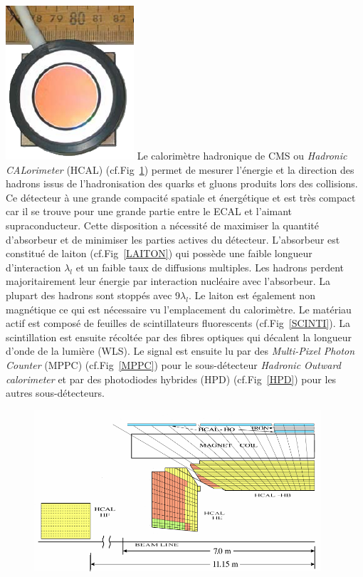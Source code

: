 \marginpar
{
	\centering
	\includegraphics[width=\marginparwidth]{CMS/HPD.png}
	\label{HPD}
}
Le calorimètre hadronique de CMS ou \textit{Hadronic CALorimeter} (HCAL) (cf.Fig~\ref{HCAL}) permet de mesurer l'énergie et la direction des hadrons issus de l'hadronisation des quarks et gluons produits lors des collisions. Ce détecteur à une grande compacité spatiale et énergétique et est très compact car il se trouve pour une grande partie entre le ECAL et l'aimant supraconducteur. Cette disposition a nécessité de maximiser la quantité d'absorbeur et de minimiser les parties actives du détecteur. L'absorbeur est constitué de laiton (cf.Fig~\ref{LAITON}) qui possède une faible longueur d'interaction $\lambda_{l}$ et un faible taux de diffusions multiples. Les hadrons perdent majoritairement leur énergie par interaction nucléaire avec l'absorbeur. La plupart des hadrons sont stoppés avec \num{9}$\lambda_{l}$. Le laiton est également non magnétique ce qui est nécessaire vu l'emplacement du calorimètre. Le matériau actif est composé de feuilles de scintillateurs fluorescents (cf.Fig~\ref{SCINTI}). La scintillation est ensuite récoltée par des fibres optiques qui décalent la longueur d'onde de la lumière (WLS). Le signal est ensuite lu par des \textit{Multi-Pixel Photon Counter} (MPPC) (cf.Fig~\ref{MPPC}) pour le sous-détecteur \textit{Hadronic Outward calorimeter} et par des photodiodes hybrides (HPD) (cf.Fig~\ref{HPD}) pour les autres sous-détecteurs.
\begin{figure}[ht!]
	\centering
	\includegraphics[width=0.95\textwidth]{CMS/HCALSCHEME.png}
	\label{HCAL}
\end{figure}

